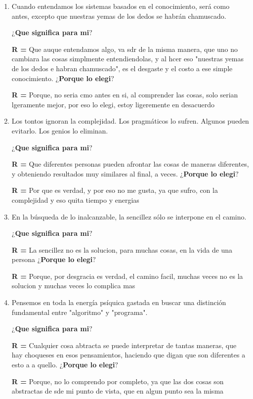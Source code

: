\documentclass[letterpaper,12pt]{article}
\begin{document}
\begin{enumerate}
\newpage
\item Cuando entendamos los sistemas basados ​​en el conocimiento, será como antes, excepto que nuestras yemas de los dedos se habrán chamuscado.\par
\textbf{$¿$Que significa para mi$?$}\par
\textbf{R =} \text Que auque entendamos algo, va sdr de la misma manera, que uno no cambiara las cosas simplmente entendiendolas, y al hcer eso "nuestras yemas de los dedos e habran chamuscado", es el desgaste y el costo a ese simple conocimiento.
\textbf{$¿$Porque lo elegi$?$}\par
\textbf{R =} \text Porque, no seria cmo antes en si, al comprender las cosas, solo serian lgeramente mejor, por eso lo elegi, estoy ligeremente en desacuerdo

\item Los tontos ignoran la complejidad. Los pragmáticos lo sufren. Algunos pueden evitarlo. Los genios lo eliminan.\par
\textbf{$¿$Que significa para mi$?$}\par
\textbf{R =} \text Que diferentes personas pueden afrontar las cosas de maneras diferentes, y obteniendo resultados muy similares al final, a veces. 
\textbf{$¿$Porque lo elegi$?$}\par
\textbf{R =} \text Por que es verdad, y por eso no me gusta, ya que sufro, con la complejidad y eso quita tiempo y energias

\item En la búsqueda de lo inalcanzable, la sencillez sólo se interpone en el camino.\par
\textbf{$¿$Que significa para mi$?$}\par
\textbf{R =} \text La sencillez no es la solucion, para muchas cosas, en la vida de una persona
\textbf{$¿$Porque lo elegi$?$}\par
\textbf{R =} \text Porque, por desgracia es verdad, el camino facil, muchas veces no es la solucion y muchas veces lo complica mas

\item Pensemos en toda la energía psíquica gastada en buscar una distinción fundamental entre "algoritmo" y "programa".\par
\textbf{$¿$Que significa para mi$?$}\par
\textbf{R =} \text Cualquier cosa abtracta se puede interpretar de tantas maneras, que hay choqueses en esos pensamientos, haciendo que digan que son diferentes a esto a a quello.
\textbf{$¿$Porque lo elegi$?$}\par
\textbf{R =} \text Porque, no lo comprendo por completo, ya que las dos cosas son abstractas de sde mi punto de vista, que en algun punto sea la misma


\end{enumerate}
\end{document}
